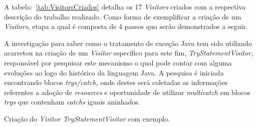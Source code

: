 A tabela:~\ref{tab:VisitorsCriados} detalha os 17 \textit{Visitors} criados com a respectiva descrição do trabalho realizado. Como forma de exemplificar a criação de um \textit{Visitors}, etapa a qual é composta de 4 passos quo serão demonstrados a seguir.

A investigação para saber como o tratamento de exceção Java tem sido utilizado acarretou na criação de um \textit{Visitor} específico para este fim, \textit{TryStatementVisitor}, responsável por pesquisar este mecanismo o qual pode contar com alguma evoluções ao logo do histórico da linguagem Java. A pesquisa é iniciada encontrando blocos \textit{trys/catch}, onde destes será coletadas as informações referentes a adoção de \textit{resources} e oportunidade de utilizar \textit{multicatch} em blocos \textit{trys} que contenham \textit{catchs} iguais aninhados.

Criação do \textit{Visitor TryStatementVisitor} com exemplo.

